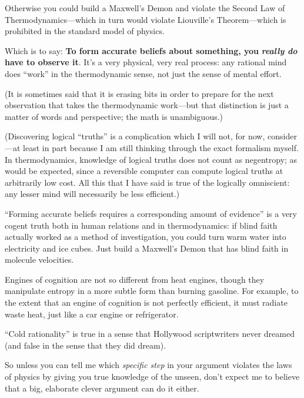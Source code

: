 {
 Otherwise you could build a Maxwell's Demon and
violate the Second Law of Thermodynamics---which in turn would violate
Liouville's Theorem---which is prohibited in the
standard model of physics.}

{
 Which is to say: \textbf{To form accurate beliefs about something,
you }\textbf{\textit{really do}}\textbf{ have to observe it}.
It's a very physical, very real process: any rational
mind does ``work'' in the
thermodynamic sense, not just the sense of mental effort.}

{
 (It is sometimes said that it is erasing bits in order to prepare
for the next observation that takes the thermodynamic work---but that
distinction is just a matter of words and perspective; the math is
unambiguous.)}

{
 (Discovering logical ``truths''
is a complication which I will not, for now, consider---at least in
part because I am still thinking through the exact formalism myself. In
thermodynamics, knowledge of logical truths does not count as
negentropy; as would be expected, since a reversible computer can
compute logical truths at arbitrarily low cost. All this that I have
said is true of the logically omniscient: any lesser mind will
necessarily be less efficient.)}

{
 ``Forming accurate beliefs requires a
corresponding amount of evidence'' is a very cogent
truth both in human relations and in thermodynamics: if blind faith
actually worked as a method of investigation, you could turn warm water
into electricity and ice cubes. Just build a Maxwell's
Demon that has blind faith in molecule velocities.}

{
 Engines of cognition are not so different from heat engines,
though they manipulate entropy in a more subtle form than burning
gasoline. For example, to the extent that an engine of cognition is not
perfectly efficient, it must radiate waste heat, just like a car engine
or refrigerator.}

{
 ``Cold rationality'' is true in
a sense that Hollywood scriptwriters never dreamed (and false in the
sense that they did dream).}

{
 So unless you can tell me which \textit{specific step} in your
argument violates the laws of physics by giving you true knowledge of
the unseen, don't expect me to believe that a big,
elaborate clever argument can do it either.}

\myendsectiontext


